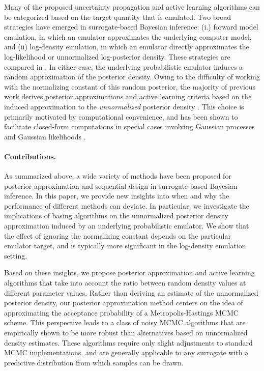 \documentclass[12pt]{article}
\begin{document}
Many of the proposed uncertainty propagation and active learning algorithms can be categorized based on the
target quantity that is emulated. Two broad strategies have emerged in surrogate-based Bayesian inference:
(i.) forward model emulation, in which an emulator approximates the underlying computer model, and 
(ii) log-density emulation, in which an emulator directly approximates the log-likelihood or unnormalized
log-posterior density. These strategies are compared in \citep{StuartTeck1,GP_PDE_priors,reviewPaper}.
In either case, the underlying probabilistic emulator induces a random approximation of the posterior density.
Owing to the difficulty of working with the normalizing constant of this random posterior, the majority of previous 
work derives posterior approximations and active learning criteria based on the induced approximation to the
\textit{unnormalized} posterior density \citep{SinsbeckNowak,VehtariParallelGP,StuartTeck1}. 
This choice is primarily motivated by computational convenience, and has been shown to facilitate closed-form
computations in special cases involving Gaussian processes and Gaussian likelihoods 
\citep{reviewPaper,StuartTeck1,StuartTeck2,GP_PDE_priors,VehtariParallelGP,Surer2023sequential}.

\paragraph{Contributions.}
As summarized above, a wide variety of methods have been proposed for posterior approximation
and sequential design in surrogate-based Bayesian inference. 
In this paper, we provide new insights into when and why the performance of different methods can
deviate. In particular, we investigate the implications of basing algorithms on the unnormalized 
posterior density approximation induced by an underlying probabilistic emulator. We show that 
the effect of ignoring the normalizing constant depends on the particular emulator target, and is 
typically more significant in the log-density emulation setting.

Based on these insights, we propose posterior approximation and active learning algorithms 
that take into account the ratio between random density values at different parameter values.
Rather than deriving an estimate of the unnormalized posterior density, our posterior approximation
method centers on the idea of approximating the acceptance probability of a Metropolis-Hastings
MCMC scheme. This perspective leads to a class of noisy MCMC algorithms \citep{noisyMCMC}
that are empirically shown to be more robust than alternatives based on unnormalized density
estimates. These algorithms require only
slight adjustments to standard MCMC implementations, and are generally applicable to any 
surrogate with a predictive distribution from which samples can be drawn.
\end{document}
